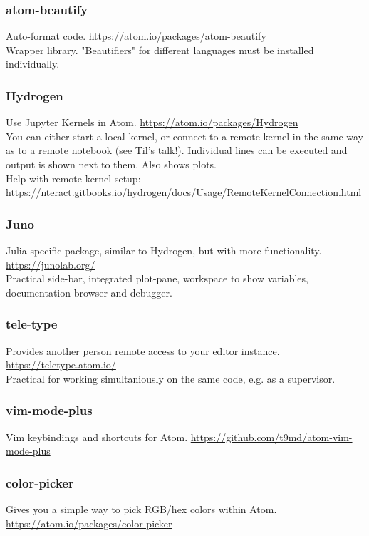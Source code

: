 \documentclass[10pt,a4paper]{article}
\begin{document}
\subsubsection{atom-beautify}
Auto-format code. \url{https://atom.io/packages/atom-beautify}\\
Wrapper library. "Beautifiers" for different languages must be installed individually.

\subsubsection{Hydrogen}
Use Jupyter Kernels in Atom. \url{https://atom.io/packages/Hydrogen}\\
You can either start a local kernel, or connect to a remote kernel in the same way as to a remote notebook (see Til's talk!).
Individual lines can be executed and output is shown next to them. Also shows plots.\\
Help with remote kernel setup: \url{https://nteract.gitbooks.io/hydrogen/docs/Usage/RemoteKernelConnection.html}

\subsubsection{Juno}
Julia specific package, similar to Hydrogen, but with more functionality. \url{https://junolab.org/}\\
Practical side-bar, integrated plot-pane, workspace to show variables, documentation browser and debugger.

\subsubsection{tele-type}
Provides another person remote access to your editor instance. \url{https://teletype.atom.io/}\\
Practical for working simultaniously on the same code, e.g. as a supervisor.

\subsubsection{vim-mode-plus}
Vim keybindings and shortcuts for Atom. \url{https://github.com/t9md/atom-vim-mode-plus}

\subsubsection{color-picker}
Gives you a simple way to pick RGB/hex colors within Atom. \url{https://atom.io/packages/color-picker}
\end{document}
